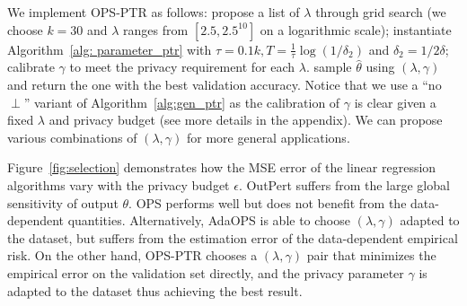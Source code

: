 We implement OPS-PTR as follows: 
propose a list of $\lambda$ through grid search (we choose $k=30$ and $\lambda$ ranges from $[2.5, 2.5^{10}]$ on a logarithmic scale); instantiate Algorithm~\ref{alg: parameter_ptr} with $\tau =0.1k, T=\frac{1}{\tau} \log(1/\delta_2)$ and  $\delta_2 = 1/2 \delta$;
calibrate $\gamma$ to meet the privacy requirement for each $\lambda$. sample $\hat{\theta}$ using $(\lambda,\gamma)$ and return the one with the best validation accuracy. Notice that we use a ``no $\perp$'' variant of Algorithm~\ref{alg:gen_ptr} as the calibration of $\gamma$ is clear given a fixed $\lambda$ and privacy budget (see more details in the appendix). We can propose various combinations of $(\lambda, \gamma)$ for more general applications.


 Figure~\ref{fig:selection}  demonstrates how  the MSE error of the linear regression algorithms vary with the privacy budget $\epsilon$. OutPert suffers from the large global sensitivity of output $\theta$. OPS performs well but does not benefit from the data-dependent quantities. Alternatively, AdaOPS is able to choose $(\lambda, \gamma)$ adapted to the dataset, but suffers from the estimation error of the data-dependent empirical risk. On the other hand, OPS-PTR chooses a  $(\lambda, \gamma)$ pair that minimizes the empirical error on the validation set directly, and the privacy parameter $\gamma$ is adapted to the dataset thus achieving the best result.


